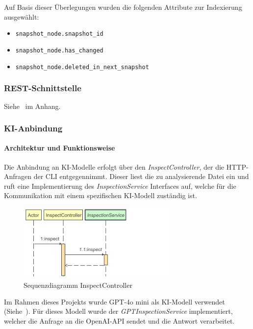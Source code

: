 \documentclass[a4paper,12pt]{report}
\begin{document}
    Auf Basis dieser Überlegungen wurden die folgenden Attribute zur Indexierung ausgewählt:
    \begin{itemize}
        \item \texttt{snapshot\_node.snapshot\_id}
        \item \texttt{snapshot\_node.has\_changed}
        \item \texttt{snapshot\_node.deleted\_in\_next\_snapshot}
    \end{itemize}

    \subsubsection{REST-Schnittstelle}
    Siehe~ im Anhang.

    \subsubsection{KI-Anbindung}\label{subsubsec:ki-anbindung}
    \paragraph*{Architektur und Funktionsweise}
    Die Anbindung an KI-Modelle erfolgt über den \textit{InspectController}, der die HTTP-Anfragen der CLI entgegennimmt.
    Dieser liest die zu analysierende Datei ein und ruft eine Implementierung des \textit{InspectionService} Interfaces auf, welche für die Kommunikation mit einem spezifischen KI-Modell zuständig ist.

    \begin{figure}[h]
        \centering
        \includegraphics[width=0.7\textwidth]{assets/InspectController_inspect_seq_diag}
        \caption{Sequenzdiagramm InspectController}
        \label{fig:seq-diag-inspect-controller}
    \end{figure}

    Im Rahmen dieses Projekts wurde GPT-4o mini als KI-Modell verwendet
    (Siehe~).
    Für dieses Modell wurde der \textit{GPTInspectionService} implementiert, welcher die Anfrage an die OpenAI-API sendet und die Antwort verarbeitet.
\end{document}
